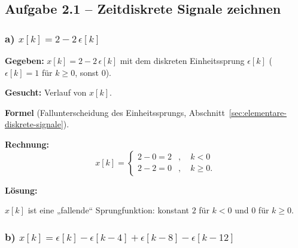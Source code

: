 \subsection*{Aufgabe 2.1 – Zeitdiskrete Signale zeichnen}

\subsubsection*{a) $x[k] = 2 - 2\,\epsilon[k]$}

\begin{beispiel}

\textbf{Gegeben:} $x[k] = 2 - 2\,\epsilon[k]$ mit dem diskreten Einheitssprung
$\epsilon[k]$ ($\epsilon[k]=1$ für $k\geq 0$, sonst $0$).

\textbf{Gesucht:} Verlauf von $x[k]$.

\textbf{Formel} (Fallunterscheidung des Einheitssprungs, Abschnitt~\ref{sec:elementare-diskrete-signale}).

\textbf{Rechnung:}
$$
x[k] = \begin{cases} 2 - 0 = 2 & , \quad k < 0 \\ 2 - 2 = 0 & , \quad k \geq 0. \end{cases}
$$

\textbf{Lösung:}
\begin{center}
\end{center}
$x[k]$ ist eine „fallende`` Sprungfunktion: konstant $2$ für $k<0$ und $0$ für
$k\geq 0$.
\end{beispiel}

\subsubsection*{b) $x[k] = \epsilon[k] - \epsilon[k-4] + \epsilon[k-8] - \epsilon[k-12]$}

